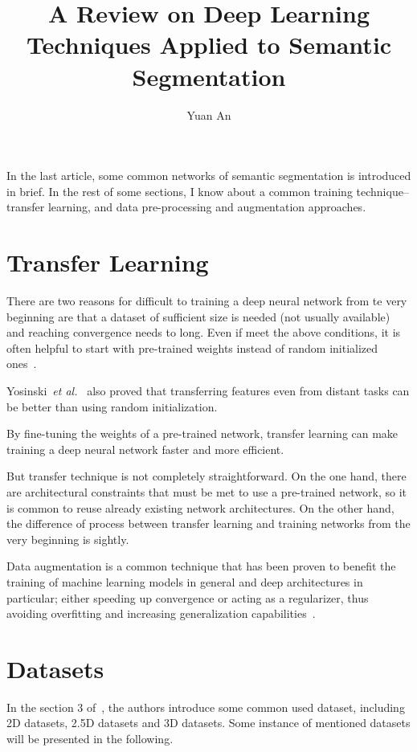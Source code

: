 \documentclass[10pt,twocolumn,letterpaper]{article}
\begin{document}
	\title{A Review on Deep Learning Techniques Applied to Semantic Segmentation}	
	\author{Yuan An}
	\maketitle
	In the last article, some common networks of semantic segmentation is introduced in brief. In the rest of some sections, I know about a common training technique--transfer learning, and data pre-processing and augmentation approaches.
	\section*{Transfer Learning}
	There are two reasons for difficult to training a deep neural network from te very beginning are that a dataset of sufficient size is needed (not usually available) and reaching convergence needs to long. Even if meet the above conditions, it is often helpful to start with pre-trained weights instead of random initialized ones~\cite{Ahmed2008Training,Oquab2014Learning}.
	\par
	Yosinski~\emph{et al.}~\cite{Yosinski2014How} also proved that transferring features even from distant tasks can be better than using random initialization.
	\par
	By fine-tuning the weights of a pre-trained network, transfer learning can make training a deep neural network faster and more efficient.
	\par
	But transfer technique is not completely straightforward. On the one hand, there are architectural constraints that must be met to use a pre-trained network, so it is common to reuse already existing network architectures. On the other hand, the difference of process between transfer learning and training networks from the very beginning is sightly.
	\par
	Data augmentation is a common technique that has been proven to benefit the training of machine learning models in general and deep architectures in particular; either speeding up convergence or acting as a regularizer, thus avoiding overfitting and increasing generalization capabilities~\cite{Wong2016}.
	\section*{Datasets}
	In the section 3 of~\cite{citedarticle}, the authors introduce some common used dataset, including 2D datasets, 2.5D datasets and 3D datasets. Some instance of mentioned datasets will be presented in the following.
\end{document}

